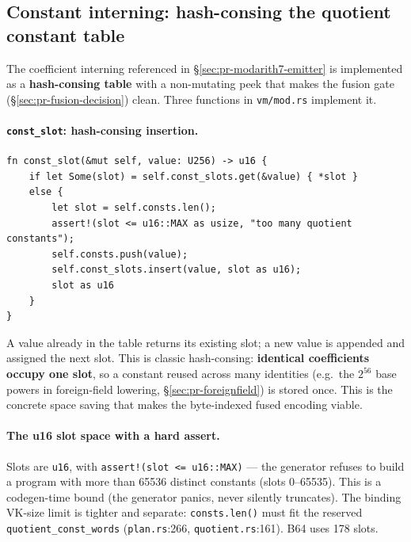 \subsection{Constant interning: hash-consing the quotient constant table}
\label{sec:pr-const-intern}

The coefficient interning referenced in
§\ref{sec:pr-modarith7-emitter} is implemented as a
\textbf{hash-consing table} with a non-mutating peek that makes
the fusion gate (§\ref{sec:pr-fusion-decision}) clean. Three
functions in \texttt{vm/mod.rs} implement it.

\paragraph{\texttt{const\_slot}: hash-consing insertion.}
\begin{lstlisting}[style=rust]
fn const_slot(&mut self, value: U256) -> u16 {
    if let Some(slot) = self.const_slots.get(&value) { *slot }
    else {
        let slot = self.consts.len();
        assert!(slot <= u16::MAX as usize, "too many quotient constants");
        self.consts.push(value);
        self.const_slots.insert(value, slot as u16);
        slot as u16
    }
}
\end{lstlisting}
A value already in the table returns its existing slot; a new
value is appended and assigned the next slot. This is classic
hash-consing: \textbf{identical coefficients occupy one slot},
so a constant reused across many identities (e.g.\ the $2^{56}$
base powers in foreign-field lowering, §\ref{sec:pr-foreignfield})
is stored once. This is the concrete space saving that makes the
byte-indexed fused encoding viable.

\paragraph{The u16 slot space with a hard assert.}
Slots are \texttt{u16}, with
\texttt{assert!(slot <= u16::MAX)} --- the generator refuses to
build a program with more than 65536 distinct constants (slots
0--65535). This is a codegen-time bound (the generator panics,
never silently truncates). The binding VK-size limit is tighter
and separate: \texttt{consts.len()} must fit the reserved
\texttt{quotient\_\allowbreak{}const\_\allowbreak{}words} (\texttt{plan.rs}:266,
\texttt{quotient.rs}:161). B64 uses 178 slots.


